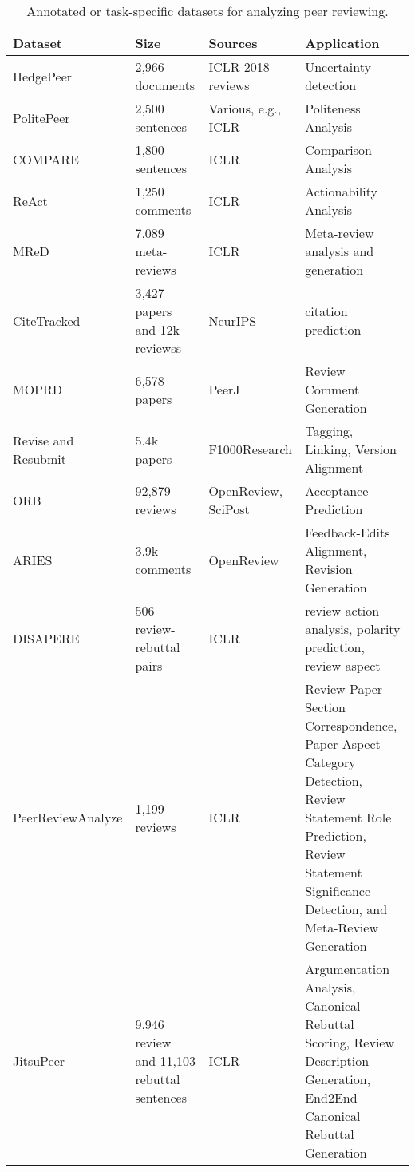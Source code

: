 \begin{table}[th!]
\small
    \centering
    \begin{tabular}{p{2.5cm} p{2.5cm}p{2.3cm}p{6.2cm}}
    \toprule
       \textbf{Dataset}  & \textbf{Size} & \textbf{Sources} & \textbf{Application} \\
       \midrule
        HedgePeer \cite{10.1145/3529372.3533300} & 2,966 documents & ICLR 2018 reviews & Uncertainty detection\\
PolitePeer \cite{politepeer} &2,500 sentences & Various, %
e.g., ICLR & Politeness Analysis\\
COMPARE \cite{singh2021compare} & 1,800 sentences & ICLR & Comparison Analysis\\

ReAct \cite{Choudhary_2021} & 1,250 comments & ICLR & Actionability Analysis\\
MReD \cite{shen-etal-2022-mred} & 7,089 meta-reviews & ICLR & Meta-review analysis and generation\\ 
CiteTracked \cite{Plank2019CiteTrackedAL} & 3,427 papers and 12k reviewss & NeurIPS & citation prediction \\
MOPRD \cite{Lin_2023} & 6,578 papers & PeerJ & Review Comment Generation \\ 
Revise and Resubmit \cite{10.1162/coli_a_00455} & 5.4k papers & F1000Research & Tagging, Linking, Version Alignment  \\
ORB \cite{szumega2023open} & 92,879 reviews & OpenReview, SciPost & Acceptance Prediction\\ 
ARIES \cite{d2023aries} & 3.9k comments & OpenReview & Feedback-Edits Alignment, Revision Generation  \\ 
DISAPERE \cite{kennard-etal-2022-disapere} & 506 review-rebuttal pairs & ICLR & review action analysis, polarity prediction, review aspect \\
PeerReviewAnalyze \cite{10.1371/journal.pone.0259238} & 1,199 reviews & ICLR & Review Paper Section Correspondence, Paper Aspect Category Detection, Review Statement Role Prediction, Review Statement Significance Detection, and Meta-Review Generation\\
JitsuPeer \cite{purkayastha-etal-2023-exploring} & 9,946 review and 11,103 rebuttal sentences& ICLR & Argumentation Analysis, Canonical Rebuttal Scoring, Review Description Generation, End2End Canonical Rebuttal Generation\\

\bottomrule
    \end{tabular}
    \caption{Annotated or task-specific datasets for analyzing peer reviewing.}
    \label{tab:data_peer_reviewing}
    \vspace{-5mm}
\end{table}
